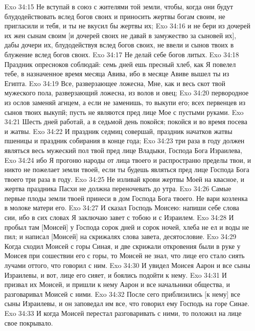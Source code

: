 \vs Exo 34:15 Не вступай в союз с жителями той земли, чтобы, когда они будут блудодействовать вслед богов своих и приносить жертвы богам своим, не пригласили и тебя, и ты не вкусил бы жертвы их;
\vs Exo 34:16 и не бери из дочерей их жен сынам своим [и дочерей своих не давай в замужество за сыновей их], дабы дочери их, блудодействуя вслед богов своих, не ввели и сынов твоих в блужение вслед богов своих.
\vs Exo 34:17 Не делай себе богов литых.
\vs Exo 34:18 Праздник опресноков соблюдай: семь дней ешь пресный хлеб, как Я повелел тебе, в назначенное время месяца Авива, ибо в месяце Авиве вышел ты из Египта.
\vs Exo 34:19 Все, разверзающее ложесна, Мне, как и весь скот твой мужеского пола, разверзающий ложесна, из волов и овец;
\vs Exo 34:20 первородное из ослов заменяй агнцем, а если не заменишь, то выкупи его; всех первенцев из сынов твоих выкупй; пусть не являются пред лице Мое с пустыми руками.
\vs Exo 34:21 Шесть дней работай, а в седьмой день покойся; покойся и во время посева и жатвы.
\vs Exo 34:22 И праздник седмиц совершай, праздник начатков жатвы пшеницы и праздник собирания  в конце года;
\vs Exo 34:23 три раза в году должен являться весь мужеский пол твой пред лице Владыки, Господа Бога Израилева,
\vs Exo 34:24 ибо Я прогоню народы от лица твоего и распространю пределы твои, и никто не пожелает земли твоей, если ты будешь являться пред лице Господа Бога твоего три раза в году.
\vs Exo 34:25 Не изливай крови жертвы Моей на квасное, и жертва праздника Пасхи не должна переночевать до утра.
\vs Exo 34:26 Самые первые плоды земли твоей принеси в дом Господа Бога твоего. Не вари козленка в молоке матери его.
\vs Exo 34:27 И сказал Господь Моисею: напиши себе слова сии, ибо в сих словах Я заключаю завет с тобою и с Израилем.
\vs Exo 34:28 И пробыл там [Моисей] у Господа сорок дней и сорок ночей, хлеба не ел и воды не пил; и написал [Моисей] на скрижалях слова завета, десятословие.
\rsbpar\vs Exo 34:29 Когда сходил Моисей с горы Синая, и две скрижали откровения были в руке у Моисея при сошествии его с горы, то Моисей не знал, что лице его стало сиять лучами оттого, что  говорил с ним.
\vs Exo 34:30 И увидел Моисея Аарон и все сыны Израилевы, и вот, лице его сияет, и боялись подойти к нему.
\vs Exo 34:31 И призвал их Моисей, и пришли к нему Аарон и все начальники общества, и разговаривал Моисей с ними.
\vs Exo 34:32 После сего приблизились [к нему] все сыны Израилевы, и он заповедал им все, что говорил ему Господь на горе Синае.
\vs Exo 34:33 И когда Моисей перестал разговаривать с ними, то положил на лице свое покрывало.

